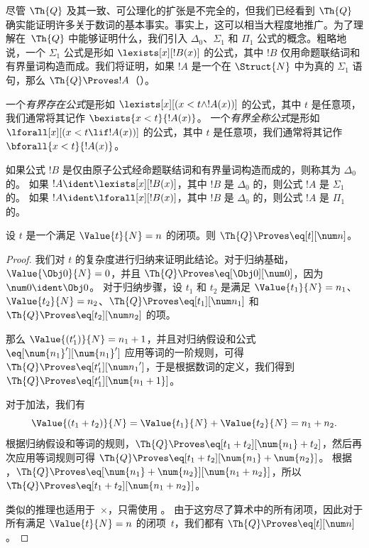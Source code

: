 \documentclass[../../../include/open-logic-section]{subfiles}
\begin{document}

尽管 $\Th{Q}$ 及其一致、可公理化的扩张是不完全的，但我们已经看到 $\Th{Q}$ 确实能证明许多关于数词的基本事实。事实上，这可以相当大程度地推广。为了理解在~$\Th{Q}$ 中能够证明什么，我们引入 $\Delta_0$、$\Sigma_1$ 和 $\Pi_1$ 公式的概念。粗略地说，一个 $\Sigma_1$ 公式是形如 $\lexists[x][!B(x)]$ 的公式，其中 $!B$ 仅用命题联结词和有界量词构造而成。我们将证明，如果 $!A$ 是一个在 $\Struct{N}$ 中为真的 $\Sigma_1$ 语句，那么 $\Th{Q} \Proves !A$（）。

\begin{defn}
一个\emph{有界存在公式}是形如 $\lexists[x][(x < t \land !A(x))]$ 的公式，其中 $t$ 是任意项，我们通常将其记作 $\bexists{x < t}{!A(x)}$。
%
一个\emph{有界全称公式}是形如 $\lforall[x][(x < t \lif !A(x))]$ 的公式，其中 $t$ 是任意项，我们通常将其记作 $\bforall{x < t}{!A(x)}$。
\end{defn}

\begin{defn}
如果公式 $!B$ 是仅由原子公式经命题联结词和有界量词构造而成的，则称其为 $\Delta_0$ 的。
%
如果 $!A \ident \lexists[x][!B(x)]$，其中 $!B$ 是 $\Delta_0$ 的，则公式 $!A$ 是 $\Sigma_1$ 的。
%
如果 $!A \ident \lforall[x][!B(x)]$，其中 $!B$ 是 $\Delta_0$ 的，则公式 $!A$ 是 $\Pi_1$ 的。
\end{defn}

\begin{lem}
 设 $t$ 是一个满足 $\Value{t}{N} = n$ 的闭项。则 $\Th{Q} \Proves \eq[t][\num n]$。
\end{lem}

\begin{proof}
我们对 $t$ 的复杂度进行归纳来证明此结论。对于归纳基础，$\Value{\Obj 0}{N} = 0$，并且 $\Th{Q} \Proves \eq[\Obj 0][\num 0]$，因为 $\num 0 \ident \Obj 0$。
%
对于归纳步骤，设 $t_1$ 和 $t_2$ 是满足 $\Value{t_1}{N} = n_1$、$\Value{t_2}{N} = n_2$、$\Th{Q} \Proves \eq[t_1][\num n_1]$ 和 $\Th{Q} \Proves \eq[t_2][\num n_2]$ 的项。

那么 $\Value{(t_1')}{N} = n_1 + 1$，并且对归纳假设和公式 $\eq[\num{n_1}'][\num{n_1}']$ 应用等词的一阶规则，可得 $\Th{Q} \Proves
\eq[t_1'][{\num n_1}']$，于是根据数词的定义，我们得到 $\Th{Q} \Proves \eq[t_1'][\num{n_1 + 1}]$。

对于加法，我们有
\[
      \Value{(t_1 + t_2)}{N}
    = \Value{t_1}{N} + \Value{t_2}{N}
    = n_1 + n_2.
\]
根据归纳假设和等词的规则，$\Th{Q} \Proves \eq[t_1 + t_2][\num{n_1} + t_2]$，然后再次应用等词规则可得 $\Th{Q} \Proves \eq[t_1 + t_2][\num{n_1} + \num{n_2}]$。
根据 ，$\Th{Q} \Proves \eq[\num{n_1} + \num{n_2}][\num{n_1 + n_2}]$，所以 $\Th{Q} \Proves \eq[t_1 + t_2][\num{n_1 + n_2}]$。

类似的推理也适用于~$\times$，只需使用 。
%
由于这穷尽了算术中的所有闭项，因此对于所有满足 $\Value{t}{N} = n$ 的闭项~$t$，我们都有 $\Th{Q} \Proves \eq[t][\num n]$。
\end{proof}
\end{document}
